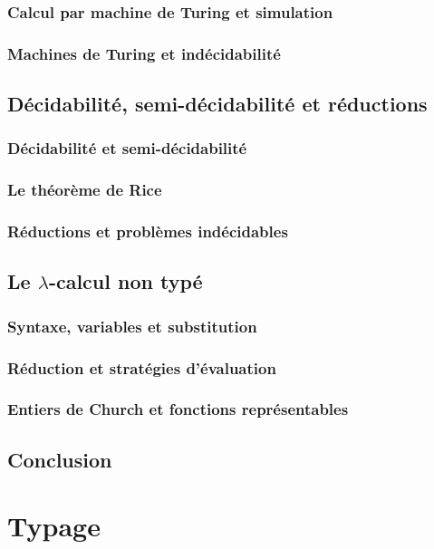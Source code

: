 \subsection{Calcul par machine de Turing et simulation}
\subsection{Machines de Turing et indécidabilité}

\section{Décidabilité, semi-décidabilité et réductions}
\subsection{Décidabilité et semi-décidabilité}
\subsection{Le théorème de Rice}
\subsection{Réductions et problèmes indécidables}

\section{Le \texorpdfstring{$\lambda$}{lambda}-calcul non typé}
\subsection{Syntaxe, variables et substitution}
\subsection{Réduction et stratégies d'évaluation}
\subsection{Entiers de Church et fonctions représentables}

\section{Conclusion}\label{section-computability-conclusion}


\chapter{Typage}\label{chapter-typing}

